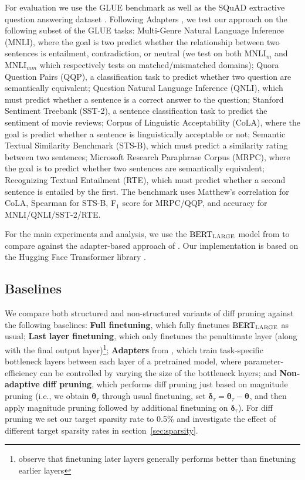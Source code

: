 For evaluation we use the GLUE benchmark \citep{wang2019structuredpruning} as well as the SQuAD  extractive question answering dataset \citep{rajpurkar-etal-2016-squad}. Following Adapters \citep{houlsby2019adapters}, we test our approach on the following subset of the GLUE tasks: Multi-Genre Natural Language Inference ({MNLI}), where the goal is two predict whether the relationship between two sentences is entailment, contradiction, or neutral (we test on both MNLI$_m$ and MNLI$_{mm}$ which respectively tests on matched/mismatched domains); Quora Question Pairs ({QQP}), a classification task to predict whether two question are semantically equivalent;  Question Natural Language Inference ({QNLI}), which must predict whether a sentence is a correct answer to the question; Stanford Sentiment Treebank ({SST-2}), a sentence classification task to predict the sentiment of movie reviews; Corpus of Linguistic Acceptability ({CoLA}), where the goal is predict whether a sentence is linguistically acceptable or not; Semantic Textual Similarity Benchmark ({STS-B}), which must predict a similarity rating between two sentences; Microsoft Research Paraphrase Corpus ({MRPC}), where the goal is to predict whether two sentences are semantically equivalent; Recognizing Textual Entailment ({RTE}), which must predict whether a second sentence is entailed by the first. The benchmark uses Matthew's correlation for CoLA, Spearman for STS-B, F$_1$ score for MRPC/QQP, and accuracy for MNLI/QNLI/SST-2/RTE. 

For the main experiments and analysis, we use the $\text{BERT}_{\textsc{LARGE}}$ model from \citet{devlin2018bert} to compare against the adapter-based approach of  \citet{houlsby2019adapters}. Our implementation is based on the Hugging Face Transformer library \citep{Wolf2019HuggingFacesTS}.

\subsection{Baselines}

We compare both structured and non-structured variants of diff pruning against the following baselines: \textbf{Full finetuning}, which fully finetunes $\text{BERT}_\textsc{LARGE}$ as usual; \textbf{Last layer finetuning}, which only finetunes the penultimate layer (along with the final output layer)\footnote{\citet{wu2020sim} observe that finetuning later layers generally performs better than finetuning earlier layers}; \textbf{Adapters} from \citet{houlsby2019adapters}, which train task-specific bottleneck layers between each layer of a pretrained model, where parameter-efficiency can be controlled by varying the size of the bottleneck layers; and \textbf{Non-adaptive diff pruning}, which performs diff pruning just based on magnitude pruning (i.e., we obtain $\boldsymbol{\theta}_\tau$ through usual finetuning, set $\boldsymbol{\delta}_\tau = \boldsymbol{\theta}_\tau - \boldsymbol{\theta}_\text{}$, and then apply magnitude pruning followed by additional finetuning on $\boldsymbol{\delta}_\tau$). For diff pruning we set our target sparsity rate to 0.5\% and investigate the effect of different target sparsity rates in section~\ref{sec:sparsity}. 

